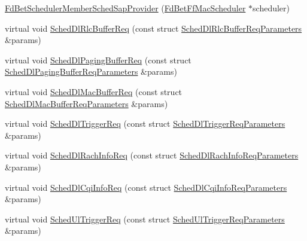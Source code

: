 \begin{DoxyCompactItemize}
\item 
\hyperlink{classns3_1_1FdBetSchedulerMemberSchedSapProvider_abd1d7268bb90479c3b90bba558b4e208}{Fd\+Bet\+Scheduler\+Member\+Sched\+Sap\+Provider} (\hyperlink{classns3_1_1FdBetFfMacScheduler}{Fd\+Bet\+Ff\+Mac\+Scheduler} $\ast$scheduler)
\item 
virtual void \hyperlink{classns3_1_1FdBetSchedulerMemberSchedSapProvider_a875bedb78797ad973ecad4cff502609c}{Sched\+Dl\+Rlc\+Buffer\+Req} (const struct \hyperlink{structns3_1_1FfMacSchedSapProvider_1_1SchedDlRlcBufferReqParameters}{Sched\+Dl\+Rlc\+Buffer\+Req\+Parameters} \&params)
\item 
virtual void \hyperlink{classns3_1_1FdBetSchedulerMemberSchedSapProvider_a61abe35fbff4d4e27571ad5897932331}{Sched\+Dl\+Paging\+Buffer\+Req} (const struct \hyperlink{structns3_1_1FfMacSchedSapProvider_1_1SchedDlPagingBufferReqParameters}{Sched\+Dl\+Paging\+Buffer\+Req\+Parameters} \&params)
\item 
virtual void \hyperlink{classns3_1_1FdBetSchedulerMemberSchedSapProvider_aabd874cf4a212e0d4420de2b0a531a64}{Sched\+Dl\+Mac\+Buffer\+Req} (const struct \hyperlink{structns3_1_1FfMacSchedSapProvider_1_1SchedDlMacBufferReqParameters}{Sched\+Dl\+Mac\+Buffer\+Req\+Parameters} \&params)
\item 
virtual void \hyperlink{classns3_1_1FdBetSchedulerMemberSchedSapProvider_aca345631a989122331e9665f62119fb2}{Sched\+Dl\+Trigger\+Req} (const struct \hyperlink{structns3_1_1FfMacSchedSapProvider_1_1SchedDlTriggerReqParameters}{Sched\+Dl\+Trigger\+Req\+Parameters} \&params)
\item 
virtual void \hyperlink{classns3_1_1FdBetSchedulerMemberSchedSapProvider_af53cadc4d1a6a31ee5ba3912827c90f8}{Sched\+Dl\+Rach\+Info\+Req} (const struct \hyperlink{structns3_1_1FfMacSchedSapProvider_1_1SchedDlRachInfoReqParameters}{Sched\+Dl\+Rach\+Info\+Req\+Parameters} \&params)
\item 
virtual void \hyperlink{classns3_1_1FdBetSchedulerMemberSchedSapProvider_a6697443a7dac1b1c72fd65c5937a7b80}{Sched\+Dl\+Cqi\+Info\+Req} (const struct \hyperlink{structns3_1_1FfMacSchedSapProvider_1_1SchedDlCqiInfoReqParameters}{Sched\+Dl\+Cqi\+Info\+Req\+Parameters} \&params)
\item 
virtual void \hyperlink{classns3_1_1FdBetSchedulerMemberSchedSapProvider_a7b813b309793f521bb1ad7b41aaf7519}{Sched\+Ul\+Trigger\+Req} (const struct \hyperlink{structns3_1_1FfMacSchedSapProvider_1_1SchedUlTriggerReqParameters}{Sched\+Ul\+Trigger\+Req\+Parameters} \&params)

\end{DoxyCompactItemize}
